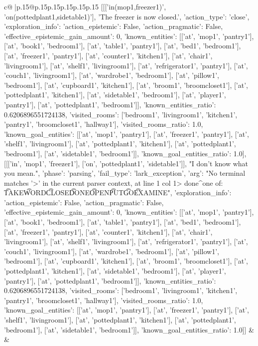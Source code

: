 \documentclass{article}
\begin{document}
{\begin{supertabular}{c@{$\;$}|p{.15\linewidth}@{}p{.15\linewidth}p{.15\linewidth}p{.15\linewidth}p{.15\linewidth}p{.15\linewidth}}
{{{	 [[['in(mop1,freezer1)', 'on(pottedplant1,sidetable1)'], 'The freezer is now closed.', {'action_type': 'close', 'exploration_info': {'action_epistemic': False, 'action_pragmatic': False, 'effective_epistemic_gain_amount': 0, 'known_entities': [['at', 'mop1', 'pantry1'], ['at', 'book1', 'bedroom1'], ['at', 'table1', 'pantry1'], ['at', 'bed1', 'bedroom1'], ['at', 'freezer1', 'pantry1'], ['at', 'counter1', 'kitchen1'], ['at', 'chair1', 'livingroom1'], ['at', 'shelf1', 'livingroom1'], ['at', 'refrigerator1', 'pantry1'], ['at', 'couch1', 'livingroom1'], ['at', 'wardrobe1', 'bedroom1'], ['at', 'pillow1', 'bedroom1'], ['at', 'cupboard1', 'kitchen1'], ['at', 'broom1', 'broomcloset1'], ['at', 'pottedplant1', 'kitchen1'], ['at', 'sidetable1', 'bedroom1'], ['at', 'player1', 'pantry1'], ['at', 'pottedplant1', 'bedroom1']], 'known_entities_ratio': 0.6206896551724138, 'visited_rooms': ['bedroom1', 'livingroom1', 'kitchen1', 'pantry1', 'broomcloset1', 'hallway1'], 'visited_rooms_ratio': 1.0, 'known_goal_entities': [['at', 'mop1', 'pantry1'], ['at', 'freezer1', 'pantry1'], ['at', 'shelf1', 'livingroom1'], ['at', 'pottedplant1', 'kitchen1'], ['at', 'pottedplant1', 'bedroom1'], ['at', 'sidetable1', 'bedroom1']], 'known_goal_entities_ratio': 1.0}}], [[['in', 'mop1', 'freezer1'], ['on', 'pottedplant1', 'sidetable1']], "I don't know what you mean.", {'phase': 'parsing', 'fail_type': 'lark_exception', 'arg': "No terminal matches '>' in the current parser context, at line 1 col 1\n\n> done\n^\nExpected one of: \n\t* TAKE\n\t* WORD\n\t* CLOSE\n\t* DONE\n\t* OPEN\n\t* PUT\n\t* GO\n\t* EXAMINE\n", 'exploration_info': {'action_epistemic': False, 'action_pragmatic': False, 'effective_epistemic_gain_amount': 0, 'known_entities': [['at', 'mop1', 'pantry1'], ['at', 'book1', 'bedroom1'], ['at', 'table1', 'pantry1'], ['at', 'bed1', 'bedroom1'], ['at', 'freezer1', 'pantry1'], ['at', 'counter1', 'kitchen1'], ['at', 'chair1', 'livingroom1'], ['at', 'shelf1', 'livingroom1'], ['at', 'refrigerator1', 'pantry1'], ['at', 'couch1', 'livingroom1'], ['at', 'wardrobe1', 'bedroom1'], ['at', 'pillow1', 'bedroom1'], ['at', 'cupboard1', 'kitchen1'], ['at', 'broom1', 'broomcloset1'], ['at', 'pottedplant1', 'kitchen1'], ['at', 'sidetable1', 'bedroom1'], ['at', 'player1', 'pantry1'], ['at', 'pottedplant1', 'bedroom1']], 'known_entities_ratio': 0.6206896551724138, 'visited_rooms': ['bedroom1', 'livingroom1', 'kitchen1', 'pantry1', 'broomcloset1', 'hallway1'], 'visited_rooms_ratio': 1.0, 'known_goal_entities': [['at', 'mop1', 'pantry1'], ['at', 'freezer1', 'pantry1'], ['at', 'shelf1', 'livingroom1'], ['at', 'pottedplant1', 'kitchen1'], ['at', 'pottedplant1', 'bedroom1'], ['at', 'sidetable1', 'bedroom1']], 'known_goal_entities_ratio': 1.0}}]] 
	  } 
	   } 
	   } 
	 & & \\ 
 


\end{supertabular}}
\end{document}
